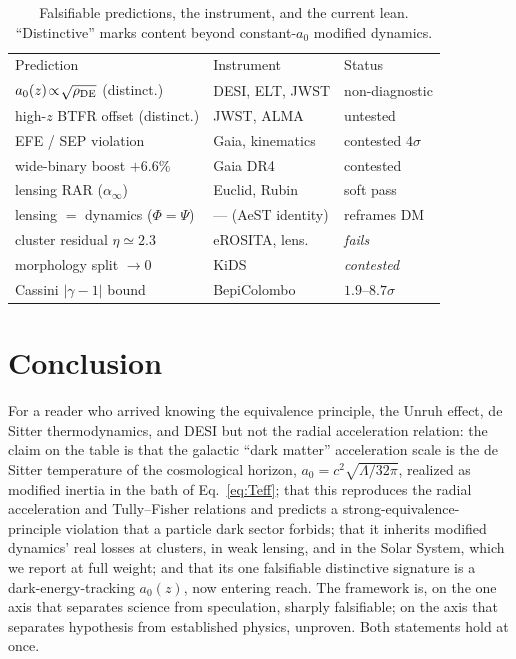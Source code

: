 \documentclass[aps,prd,twocolumn,10pt,nofootinbib,superscriptaddress]{revtex4-2}
\begin{document}
\begin{table}[t]
\caption{Falsifiable predictions, the instrument, and the current lean. ``Distinctive'' marks content beyond
constant-$a_0$ modified dynamics.}
\label{tab:pred}
\begin{ruledtabular}
\begin{tabular}{lll}
Prediction & Instrument & Status \\
\colrule
$a_0(z)\!\propto\!\sqrt{\rho_{\rm DE}}$ (distinct.) & DESI, ELT, JWST & non-diagnostic\\
high-$z$ BTFR offset (distinct.) & JWST, ALMA & untested \\
EFE / SEP violation & Gaia, kinematics & contested $4\sigma$ \\
wide-binary boost $+6.6\%$ & Gaia DR4 & contested \\
lensing RAR ($\alpha_\infty$) & Euclid, Rubin & soft pass \\
lensing $=$ dynamics ($\Phi{=}\Psi$) & — (AeST identity) & reframes DM \\
cluster residual $\eta\!\simeq\!2.3$ & eROSITA, lens. & \emph{fails} \\
morphology split $\to0$ & KiDS & \emph{contested} \\
Cassini $|\gamma{-}1|$ bound & BepiColombo & $1.9$--$8.7\sigma$ \\
\end{tabular}
\end{ruledtabular}
\end{table}

\section{Conclusion}
For a reader who arrived knowing the equivalence principle, the Unruh effect, de Sitter thermodynamics, and DESI but
not the radial acceleration relation: the claim on the table is that the galactic ``dark matter'' acceleration scale
is the de Sitter temperature of the cosmological horizon, $a_0=c^2\sqrt{\Lambda/32\pi}$, realized as modified inertia
in the bath of Eq.~\eqref{eq:Teff}; that this reproduces the radial acceleration and Tully--Fisher relations and
predicts a strong-equivalence-principle violation that a particle dark sector forbids; that it inherits modified
dynamics' real losses at clusters, in weak lensing, and in the Solar System, which we report at full weight; and
that its one falsifiable distinctive signature is a dark-energy-tracking $a_0(z)$, now entering reach. The framework
is, on the one axis that separates science from speculation, sharply falsifiable; on the axis that separates
hypothesis from established physics, unproven. Both statements hold at once.
\end{document}

